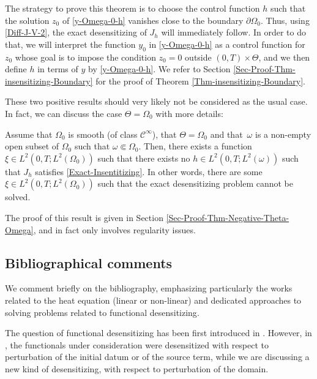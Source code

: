 The strategy to prove this theorem is to choose the control function $h$ such that the solution $z_0$ of \eqref{y-Omega-0-h} vanishes close to the boundary $\partial \Omega_0$. Thus, using \eqref{Diff-J-V-2}, the exact desensitizing of $J_h$ will immediately follow. In order to do that, we will interpret the function $y_0$ in \eqref{y-Omega-0-h} as a control function for $z_0$ whose goal is to impose the condition $z_0 = 0$ outside $(0,T) \times \Theta$, and we then define $h$ in terms of $y$ by \eqref{y-Omega-0-h}. We refer to Section \ref{Sec-Proof-Thm-insensitizing-Boundary} for the proof of Theorem \ref{Thm-insensitizing-Boundary}.

These two positive results should very likely not be considered as the usual case. In fact, we can discuss the case $\Theta = \Omega_0$ with more details:

\begin{theorem}
\label{Thm-Negative-Theta-Omega}
Assume that {$\Omega_0$ is smooth (of class $\mathscr{C}^\infty$)}, that $\Theta = \Omega_0$ and that~$\omega$ is a non-empty open subset of $\Omega_0$ such that $\omega \Subset \Omega_0$. Then, there exists a function $\xi \in L^2(0,T; L^2(\Omega_0))$ such that there exists no $h \in L^2(0,T; L^2(\omega))$ such that $J_h$ satisfies \eqref{Exact-Insentitizing}. In other words, there are some $\xi \in L^2(0,T; L^2(\Omega_0))$ such that the exact desensitizing problem cannot be solved.
\end{theorem}

The proof of this result is given in Section \ref{Sec-Proof-Thm-Negative-Theta-Omega}, and in fact only involves regularity issues.

\subsection{Bibliographical comments}\label{sec:SoA}

We comment briefly on the bibliography, emphasizing particularly the works related to the heat equation (linear or non-linear) and dedicated approaches to solving problems related to {functional desensitizing}.

The question of {functional desensitizing} has been first introduced in \cite{Lions-Sentinelles-1992,Bodart-Fabre}. However, in \cite{Lions-Sentinelles-1992,Bodart-Fabre}, the functionals under consideration were desensitized with respect to perturbation of the initial datum or of the source term, while we are discussing a new kind of desensitizing, with respect to perturbation of the domain.

